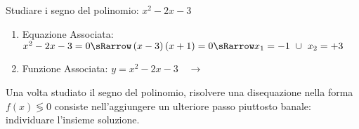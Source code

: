 \begin{esempio}
Studiare i segno del polinomio: \(x^2-2x-3\)

\begin{enumerate}
 \item
  Equazione Associata:~\(x^2-2x-3=0 \sRarrow 
                        \left(x-3 \right)\left(x+1\right)=0 \sRarrow 
                        x_1=-1~\cup~x_2=+3\)
 \item 
  \begin{minipage}{.45\textwidth}
  Funzione Associata: \(y = x^2-2x-3 \quad \rightarrow\)
  \end{minipage}
  \begin{minipage}{.30\textwidth}
  \end{minipage}
\end{enumerate}

\end{esempio}

Una volta studiato il segno del polinomio, risolvere una disequazione nella 
forma \(f(x) \lessgtr 0\) consiste nell'aggiungere un ulteriore passo 
piuttosto banale: individuare l'insieme soluzione.

